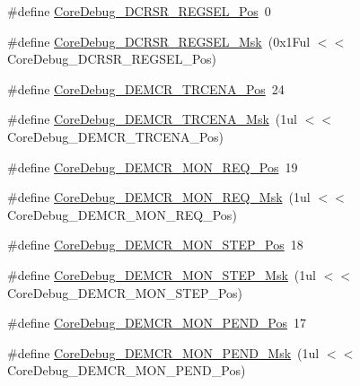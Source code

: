 \begin{DoxyCompactItemize}
\item 
\#define \hyperlink{group___c_m_s_i_s___c_m3___core_debug_ga52182c8a9f63a52470244c0bc2064f7b}{Core\+Debug\+\_\+\+D\+C\+R\+S\+R\+\_\+\+R\+E\+G\+S\+E\+L\+\_\+\+Pos}~0
\item 
\#define \hyperlink{group___c_m_s_i_s___c_m3___core_debug_ga17cafbd72b55030219ce5609baa7c01d}{Core\+Debug\+\_\+\+D\+C\+R\+S\+R\+\_\+\+R\+E\+G\+S\+E\+L\+\_\+\+Msk}~(0x1\+Ful $<$$<$ Core\+Debug\+\_\+\+D\+C\+R\+S\+R\+\_\+\+R\+E\+G\+S\+E\+L\+\_\+\+Pos)
\item 
\#define \hyperlink{group___c_m_s_i_s___c_m3___core_debug_ga6ff2102b98f86540224819a1b767ba39}{Core\+Debug\+\_\+\+D\+E\+M\+C\+R\+\_\+\+T\+R\+C\+E\+N\+A\+\_\+\+Pos}~24
\item 
\#define \hyperlink{group___c_m_s_i_s___c_m3___core_debug_ga5e99652c1df93b441257389f49407834}{Core\+Debug\+\_\+\+D\+E\+M\+C\+R\+\_\+\+T\+R\+C\+E\+N\+A\+\_\+\+Msk}~(1ul $<$$<$ Core\+Debug\+\_\+\+D\+E\+M\+C\+R\+\_\+\+T\+R\+C\+E\+N\+A\+\_\+\+Pos)
\item 
\#define \hyperlink{group___c_m_s_i_s___c_m3___core_debug_ga341020a3b7450416d72544eaf8e57a64}{Core\+Debug\+\_\+\+D\+E\+M\+C\+R\+\_\+\+M\+O\+N\+\_\+\+R\+E\+Q\+\_\+\+Pos}~19
\item 
\#define \hyperlink{group___c_m_s_i_s___c_m3___core_debug_gae6384cbe8045051186d13ef9cdeace95}{Core\+Debug\+\_\+\+D\+E\+M\+C\+R\+\_\+\+M\+O\+N\+\_\+\+R\+E\+Q\+\_\+\+Msk}~(1ul $<$$<$ Core\+Debug\+\_\+\+D\+E\+M\+C\+R\+\_\+\+M\+O\+N\+\_\+\+R\+E\+Q\+\_\+\+Pos)
\item 
\#define \hyperlink{group___c_m_s_i_s___c_m3___core_debug_ga9ae10710684e14a1a534e785ef390e1b}{Core\+Debug\+\_\+\+D\+E\+M\+C\+R\+\_\+\+M\+O\+N\+\_\+\+S\+T\+E\+P\+\_\+\+Pos}~18
\item 
\#define \hyperlink{group___c_m_s_i_s___c_m3___core_debug_ga2ded814556de96fc369de7ae9a7ceb98}{Core\+Debug\+\_\+\+D\+E\+M\+C\+R\+\_\+\+M\+O\+N\+\_\+\+S\+T\+E\+P\+\_\+\+Msk}~(1ul $<$$<$ Core\+Debug\+\_\+\+D\+E\+M\+C\+R\+\_\+\+M\+O\+N\+\_\+\+S\+T\+E\+P\+\_\+\+Pos)
\item 
\#define \hyperlink{group___c_m_s_i_s___c_m3___core_debug_ga1e2f706a59e0d8131279af1c7e152f8d}{Core\+Debug\+\_\+\+D\+E\+M\+C\+R\+\_\+\+M\+O\+N\+\_\+\+P\+E\+N\+D\+\_\+\+Pos}~17
\item 
\#define \hyperlink{group___c_m_s_i_s___c_m3___core_debug_ga68ec55930269fab78e733dcfa32392f8}{Core\+Debug\+\_\+\+D\+E\+M\+C\+R\+\_\+\+M\+O\+N\+\_\+\+P\+E\+N\+D\+\_\+\+Msk}~(1ul $<$$<$ Core\+Debug\+\_\+\+D\+E\+M\+C\+R\+\_\+\+M\+O\+N\+\_\+\+P\+E\+N\+D\+\_\+\+Pos)
\item 
$$
\end{DoxyCompactItemize}

